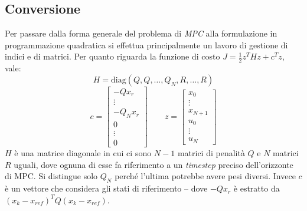 \subsection{Conversione}
Per passare dalla forma generale del problema di \textit{MPC} alla formulazione 
in programmazione quadratica si effettua principalmente un lavoro di gestione di
indici e di matrici. Per quanto riguarda la funzione di costo $J = \frac{1}{2} z^T H z + c^T z$, vale:
\[
H = \text{diag}(Q, Q, \dots, Q_N, R, \dots, R)
\]
\[
c = \begin{bmatrix}
    -Q x_r \\
    \vdots \\
    -Q_N x_r \\
    0 \\
    \vdots \\
    0
\end{bmatrix}
\quad \quad
z = \begin{bmatrix}
    x_0 \\
    \vdots \\
    x_{N+1} \\
    u_0 \\
    \vdots \\
    u_N
\end{bmatrix}
\]
$H$ è una matrice diagonale in cui ci sono $N-1$ matrici di penalità $Q$ e $N$ matrici $R$ uguali,
dove ognuna di esse fa riferimento a un \textit{timestep} preciso dell'orizzonte di MPC. Si distingue 
solo $Q_N$ perché l'ultima potrebbe avere pesi diversi.
Invece $c$ è un vettore che considera gli stati di riferimento -- dove $-Q x_r$ è 
estratto da $(x_k - x_{ref})^T Q (x_k - x_{ref})$.

